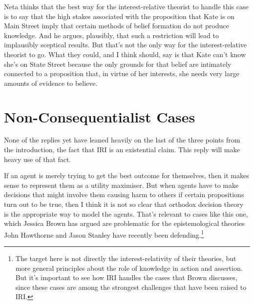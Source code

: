\documentclass[oneside]{book}
\begin{document}

Neta thinks that the best way for the interest-relative theorist to handle this case is to say that the high stakes associated with the proposition that Kate is on Main Street imply that certain methods of belief formation do not produce knowledge. And he argues, plausibly, that such a restriction will lead to implausibly sceptical results. But that's not the only way for the interest-relative theorist to go. What they could, and I think should, say is that Kate can't know she's on State Street because the only grounds for that belief are intimately connected to a proposition that, in virtue of her interests, she needs very large amounts of evidence to believe.

\section{Non-Consequentialist Cases}
None of the replies yet have leaned heavily on the last of the three points from the introduction, the fact that IRI is an existential claim. This reply will make heavy use of that fact.

If an agent is merely trying to get the best outcome for themselves, then it makes sense to represent them as a utility maximiser. But when agents have to make decisions that might involve them causing harm to others if certain propositions turn out to be true, then I think it is not so clear that orthodox decision theory is the appropriate way to model the agents. That's relevant to cases like this one, which Jessica Brown has argued are problematic for the epistemological theories John Hawthorne and Jason Stanley have recently been defending.\footnote{The target here is not directly the interest-relativity of their theories, but more general principles about the role of knowledge in action and assertion. But it's important to see how IRI handles the cases that Brown discusses, since these cases are among the strongest challenges that have been raised to IRI.}
\end{document}
